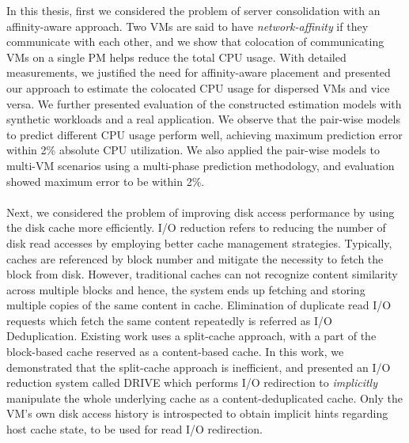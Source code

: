 In this thesis, first we considered the problem of 
server consolidation with an affinity-aware approach. Two VMs are 
said to have \textit{network-affinity} if they 
communicate with each other, and we show that colocation
of communicating VMs on a single PM helps reduce the total CPU usage.
With detailed measurements, we justified the need for
affinity-aware placement and presented our approach to estimate
the colocated CPU usage for dispersed VMs and vice versa. We 
further presented evaluation
of the constructed estimation models with synthetic workloads
and a real application. We observe that the pair-wise models
to predict different CPU usage 
perform well, achieving maximum prediction
error within 2\% absolute CPU utilization. We also applied
the pair-wise models to multi-VM scenarios using a multi-phase
prediction methodology, and evaluation showed maximum
error to be within 2\%.
\\
\\
Next, we considered the problem of improving disk access performance
by using the disk cache more efficiently. 
I/O reduction refers to reducing the number of disk read accesses by
employing better cache management strategies. Typically, caches are
referenced by block number and mitigate the necessity to fetch the block
from disk. However, traditional caches can not recognize content similarity
across multiple blocks and hence, the system ends up fetching and storing
multiple copies of the same content in cache.
Elimination of duplicate read I/O requests which fetch the same
content repeatedly is referred as I/O Deduplication.
Existing work uses a split-cache approach, with a part of the block-based
cache reserved as a content-based cache. In this work, we demonstrated
that the split-cache approach is inefficient, and presented an
I/O reduction system called DRIVE which performs I/O
redirection to \textit{implicitly} manipulate the whole underlying cache as
a content-deduplicated cache. Only the VM's own disk access history is
introspected to obtain implicit hints regarding host cache state, to be used
for read I/O redirection.

